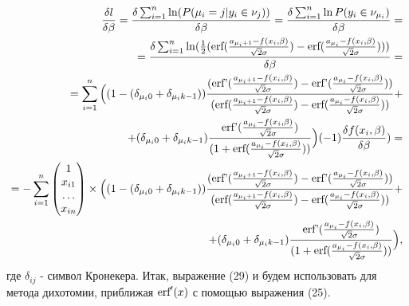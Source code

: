 \documentclass[12pt]{article}
\begin{document}
\begin{eqnarray}
    \frac{\delta l}{\delta \beta}=\frac{\delta \sum_{i=1}^{n}\ln(P(\mu_i=j|y_i\in \nu_j))}{\delta \beta}=\frac{\delta \sum_{i=1}^{n}\ln P(y_i\in \nu_{\mu_i})}{\delta \beta}=\\
    =\frac{\delta \sum_{i=1}^{n} \ln(\frac{1}{2}(\textup{erf}(\frac{a_{\mu_i+1}-f(x_i,\beta)}{\sqrt{2}\sigma})-\textup{erf}(\frac{a_{\mu_i}-f(x_i,\beta)}{\sqrt{2}\sigma})) )         }{\delta \beta}=\\
    =  \sum_{i=1}^{n}\Big((1-(\delta_{\mu_i 0}+\delta_{\mu_i k-1}))\frac{(\textup{erf'}(\frac{a_{\mu_i+1}-f(x_i,\beta)}{\sqrt{2}\sigma})-\textup{erf'}(\frac{a_{\mu_i}-f(x_i,\beta)}{\sqrt{2}\sigma}))}{ (\textup{erf}(\frac{a_{\mu_i+1}-f(x_i,\beta)}{\sqrt{2}\sigma})-\textup{erf}(\frac{a_{\mu_i}-f(x_i,\beta)}{\sqrt{2}\sigma}))}+\\
    \nonumber +(\delta_{\mu_i 0}+\delta_{\mu_i k-1})\frac{\textup{erf'}(\frac{a_{\mu_i}-f(x_i,\beta)}{\sqrt{2}\sigma})}{(1+\textup{erf}(\frac{a_{\mu_i}-f(x_i,\beta)}{\sqrt{2}\sigma}))}\Big)  (-1) \frac{\delta f(x_i,\beta)}{\delta \beta} )=\\
    =-\sum_{i=1}^{n}\begin{pmatrix}
        1\\
        x_{i1}\\
        \dots\\
        x_{in}
    \end{pmatrix}\times  \Big((1-(\delta_{\mu_i 0}+\delta_{\mu_i k-1}))\frac{(\textup{erf'}(\frac{a_{\mu_i+1}-f(x_i,\beta)}{\sqrt{2}\sigma})-\textup{erf'}(\frac{a_{\mu_i}-f(x_i,\beta)}{\sqrt{2}\sigma}))}{ (\textup{erf}(\frac{a_{\mu_i+1}-f(x_i,\beta)}{\sqrt{2}\sigma})-\textup{erf}(\frac{a_{\mu_i}-f(x_i,\beta)}{\sqrt{2}\sigma}))}+\\
    \nonumber +(\delta_{\mu_i 0}+\delta_{\mu_i k-1})\frac{\textup{erf'}(\frac{a_{\mu_i}-f(x_i,\beta)}{\sqrt{2}\sigma})}{(1+\textup{erf}(\frac{a_{\mu_i}-f(x_i,\beta)}{\sqrt{2}\sigma}))}\Big)  ,
\end{eqnarray}
где $\delta_{ij}$ - символ Кронекера.\hfill\break
Итак, выражение (29) и будем использовать для метода дихотомии, приближая $\textup{erf}'(x)$ с помощью выражения (25).
\end{document}
